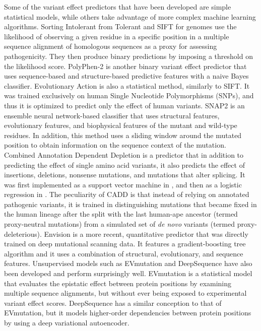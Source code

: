 Some of the variant effect predictors that have been developed are simple statistical models, while others take advantage of more complex machine learning algorithms.
Sorting Intolerant from Tolerant \parencite[SIFT,][]{Sim2012} and SIFT for genomes \parencite[SIFT 4G,][]{Vaser2015} use the likelihood of observing a given residue in a specific position in a multiple sequence alignment of homologous sequences as a proxy for assessing pathogenicity.
They then produce binary predictions by imposing a threshold on the likelihood score.
PolyPhen-2 \parencite{Adzhubei2010} is another binary variant effect predictor that uses sequence-based and structure-based predictive features with a naive Bayes classifier.
Evolutionary Action \parencite{Katsonis2014} is also a statistical method, similarly to SIFT\@.
It was trained exclusively on human Single Nucleotide Polymorphisms (SNPs), and thus it is optimized to predict only the effect of human variants.
SNAP2 \parencite{Hecht2015} is an ensemble neural network-based classifier that uses structural features, evolutionary features, and biophysical features of the mutant and wild-type residues.
In addition, this method uses a sliding window around the mutated position to obtain information on the sequence context of the mutation.
Combined Annotation Dependent Depletion \parencite[CADD,][]{Rentzsch2021,Rentzsch2018,Kircher2014} is a predictor that in addition to predicting the effect of single amino acid variants, it also predicts the effect of insertions, deletions, nonsense mutations, and mutations that alter splicing.
It was first implemented as a support vector machine in \parencite{Kircher2014}, and then as a logistic regression in \parencite{Rentzsch2018}.
The peculiarity of CADD is that instead of relying on annotated pathogenic variants, it is trained in distinguishing mutations that became fixed in the human lineage after the split with the last human-ape ancestor (termed proxy-neutral mutations) from a simulated set of \textit{de novo} variants (termed proxy-deleterious).
Envision \parencite{Gray2018} is a more recent, quantitative predictor that was directly trained on deep mutational scanning data.
It features a gradient-boosting tree algorithm and it uses a combination of structural, evolutionary, and sequence features.
Unsupervised models such as EVmutation \parencite{Hopf2017} and DeepSequence \parencite{Riesselman2018} have also been developed and perform surprisingly well.
EVmutation is a statistical model that evaluates the epistatic effect between protein positions by examining multiple sequence alignments, but without ever being exposed to experimental variant effect scores.
DeepSequence has a similar conception to that of EVmutation, but it models higher-order dependencies between protein positions by using a deep variational autoencoder.

